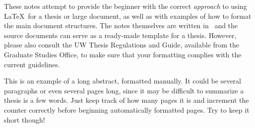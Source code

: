 These notes attempt to provide the beginner with the correct 
\emph{approach} to using \LaTeX\ for a thesis or large document, as well as
with examples of how to format the main document structures.
The notes themselves are written in \LaTeXe\ and the source documents can
serve as a ready-made template for a thesis.
However, please also consult the UW Thesis Regulations and Guide, available
from the Graduate Studies Office, to make sure that your formatting complies 
with the current guidelines.

This is an example of a long abstract, formatted manually. 
It could be several paragraphs or even several pages long, since it may
be difficult to summarize a thesis is a few words.
Just keep track of how many pages it is and increment the counter correctly
before beginning automatically formatted pages. 
Try to keep it short though!
